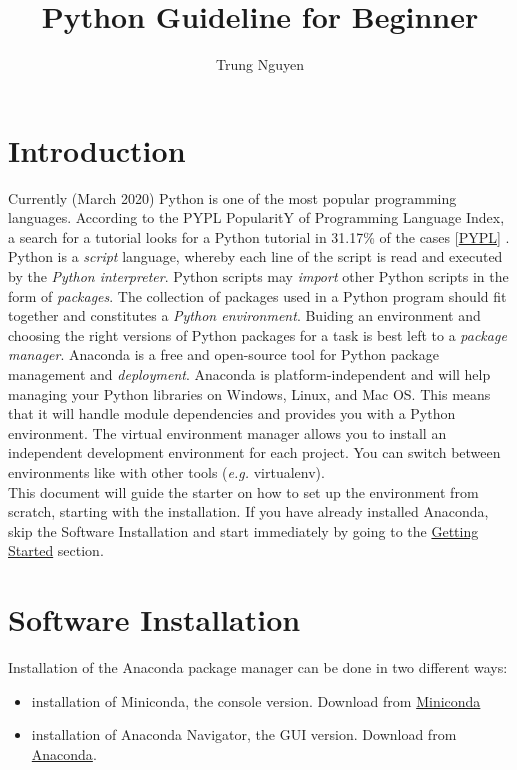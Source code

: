 \documentclass[a4paper,10pt]{article}
\title{Python Guideline for Beginner}
\author{Trung Nguyen}
\date{}
\begin{document}
\maketitle

\tableofcontents

\section{Introduction}

Currently (March 2020) Python is one of the most popular programming languages. According to the PYPL PopularitY of Programming Language Index, a search for a tutorial looks for a Python tutorial in 31.17\% of the cases [\href{http://pypl.github.io/PYPL.html}{PYPL}] \cite{PYPL}.\newline
Python is a \emph{script} language, whereby each line of the script is read and executed by the  \emph{Python interpreter}. Python scripts may \emph{import} other Python scripts in the form of \emph {packages}. The collection of packages used in a Python program should fit together and constitutes a \emph{Python environment}. Buiding an environment and choosing the right versions of Python packages for a task is best left to a \emph{package manager}.\newline
Anaconda is a free and open-source tool for Python package management and \emph{deployment}. Anaconda is platform-independent and will help managing your Python libraries on Windows, Linux, and Mac OS. This means that it will handle module dependencies and provides you with a Python environment. The virtual environment manager allows you to install an independent development environment for each project. You can switch between environments like with other tools (\textit{e.g.} virtualenv).\\ 
This document will guide the starter on how to set up the environment from scratch, starting with the installation.
If you have already installed Anaconda, skip the Software Installation and start immediately by going to the \hyperref[sec:start]{Getting Started} section.



\section{ Software Installation}

Installation of the Anaconda package manager can be done in two different ways:
\begin{itemize}
	\item installation of Miniconda, the console version. Download from \href{https://docs.conda.io/en/latest/miniconda.html}{Miniconda}
	\item installation of Anaconda Navigator, the GUI version. Download from \href{https://www.anaconda.com/products/individual}{Anaconda}.
\end{itemize}
\end{document}
